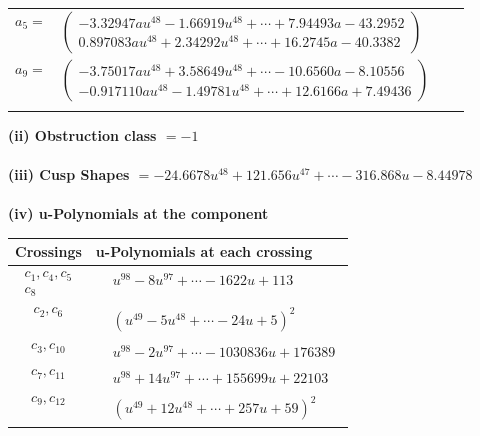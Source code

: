 \documentclass[1p]{elsarticle_modified}
\theoremstyle{definition}
\begin{document}
\begin{tabular}{m{7pt} m{180pt} m{7pt} m{180pt} }
\flushright $a_{5}=$&$\begin{pmatrix}-3.32947 a u^{48}-1.66919 u^{48}+\cdots+7.94493 a-43.2952\\0.897083 a u^{48}+2.34292 u^{48}+\cdots+16.2745 a-40.3382\end{pmatrix}$ \\
\flushright $a_{9}=$&$\begin{pmatrix}-3.75017 a u^{48}+3.58649 u^{48}+\cdots-10.6560 a-8.10556\\-0.917110 a u^{48}-1.49781 u^{48}+\cdots+12.6166 a+7.49436\end{pmatrix}$\\&\end{tabular}
\flushleft \textbf{(ii) Obstruction class $= -1$}\\~\\
\flushleft \textbf{(iii) Cusp Shapes $= -24.6678 u^{48}+121.656 u^{47}+\cdots-316.868 u-8.44978$}\\~\\
\newpage\renewcommand{\arraystretch}{1}
\flushleft \textbf{(iv) u-Polynomials at the component}\newline \\
\begin{tabular}{m{50pt}|m{274pt}}
Crossings & \hspace{64pt}u-Polynomials at each crossing \\
\hline $$\begin{aligned}c_{1},c_{4},c_{5}\\c_{8}\end{aligned}$$&$\begin{aligned}
&u^{98}-8 u^{97}+\cdots-1622 u+113
\end{aligned}$\\
\hline $$\begin{aligned}c_{2},c_{6}\end{aligned}$$&$\begin{aligned}
&(u^{49}-5 u^{48}+\cdots-24 u+5)^{2}
\end{aligned}$\\
\hline $$\begin{aligned}c_{3},c_{10}\end{aligned}$$&$\begin{aligned}
&u^{98}-2 u^{97}+\cdots-1030836 u+176389
\end{aligned}$\\
\hline $$\begin{aligned}c_{7},c_{11}\end{aligned}$$&$\begin{aligned}
&u^{98}+14 u^{97}+\cdots+155699 u+22103
\end{aligned}$\\
\hline $$\begin{aligned}c_{9},c_{12}\end{aligned}$$&$\begin{aligned}
&(u^{49}+12 u^{48}+\cdots+257 u+59)^{2}
\end{aligned}$\\
\hline
\end{tabular}\\~\\
\end{document}
